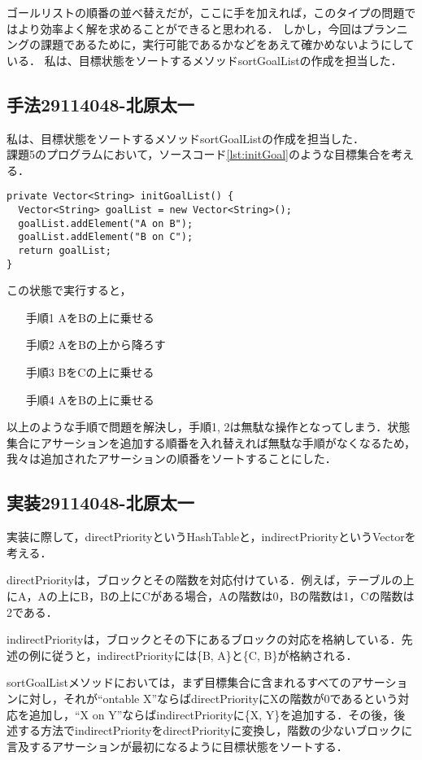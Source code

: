 \documentclass{jarticle}
\begin{document}
ゴールリストの順番の並べ替えだが，ここに手を加えれば，このタイプの問題ではより効率よく解を求めることができると思われる．
しかし，今回はプランニングの課題であるために，実行可能であるかなどをあえて確かめないようにしている．
私は、目標状態をソートするメソッドsortGoalListの作成を担当した．
\subsection{手法29114048-北原太一}
私は、目標状態をソートするメソッドsortGoalListの作成を担当した．\\
課題5のプログラムにおいて，ソースコード\ref{lst:initGoal}のような目標集合を考える．
\begin{lstlisting}[caption=Planner.java(一部抜粋),label=lst:initGoal]
private Vector<String> initGoalList() {
  Vector<String> goalList = new Vector<String>();
  goalList.addElement("A on B");
  goalList.addElement("B on C");
  return goalList;
}
  \end{lstlisting}
 
この状態で実行すると，
\begin{enumerate}
\item[手順1] AをBの上に乗せる
\item[手順2] AをBの上から降ろす
\item[手順3] BをCの上に乗せる
\item[手順4] AをBの上に乗せる
\end{enumerate}
以上のような手順で問題を解決し，手順1, 2は無駄な操作となってしまう．状態集合にアサーションを追加する順番を入れ替えれば無駄な手順がなくなるため，我々は追加されたアサーションの順番をソートすることにした．

\subsection{実装29114048-北原太一}
実装に際して，directPriorityというHashTableと，indirectPriorityというVectorを考える．

directPriorityは，ブロックとその階数を対応付けている．例えば，テーブルの上にA，Aの上にB，Bの上にCがある場合，Aの階数は0，Bの階数は1，Cの階数は2である．

indirectPriorityは，ブロックとその下にあるブロックの対応を格納している．先述の例に従うと，indirectPriorityには\{B, A\}と\{C, B\}が格納される．
  
sortGoalListメソッドにおいては，まず目標集合に含まれるすべてのアサーションに対し，それが``ontable X''ならばdirectPriorityにXの階数が0であるという対応を追加し，``X on Y''ならばindirectPriorityに\{X, Y\}を追加する．その後，後述する方法でindirectPriorityをdirectPriorityに変換し，階数の少ないブロックに言及するアサーションが最初になるように目標状態をソートする．
\end{document}
